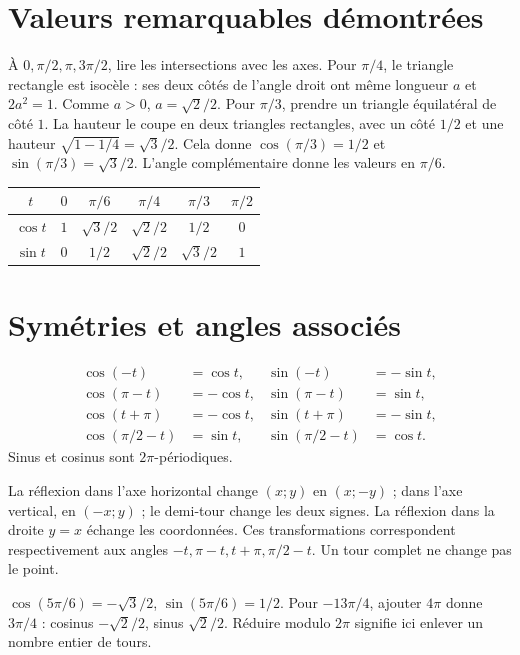 \documentclass[../cours_1re.tex]{subfiles}
\begin{document}
\section{Valeurs remarquables démontrées}
À $0,\pi/2,\pi,3\pi/2$, lire les intersections avec les axes.
Pour $\pi/4$, le triangle rectangle est isocèle : ses deux côtés de l'angle droit ont même longueur $a$ et $2a^2=1$. Comme $a>0$, $a=\sqrt2/2$.
Pour $\pi/3$, prendre un triangle équilatéral de côté $1$. La hauteur le coupe en deux triangles rectangles, avec un côté $1/2$ et une hauteur $\sqrt{1-1/4}=\sqrt3/2$. Cela donne $\cos(\pi/3)=1/2$ et $\sin(\pi/3)=\sqrt3/2$. L'angle complémentaire donne les valeurs en $\pi/6$.
\begin{center}\begin{tabular}{c|ccccc}
$t$&$0$&$\pi/6$&$\pi/4$&$\pi/3$&$\pi/2$\\\hline
$\cos t$&$1$&$\sqrt3/2$&$\sqrt2/2$&$1/2$&$0$\\
$\sin t$&$0$&$1/2$&$\sqrt2/2$&$\sqrt3/2$&$1$
\end{tabular}\end{center}
\section{Symétries et angles associés}
\begin{propriete}
\[
\begin{aligned}
\cos(-t)&=\cos t,&\sin(-t)&=-\sin t,\\
\cos(\pi-t)&=-\cos t,&\sin(\pi-t)&=\sin t,\\
\cos(t+\pi)&=-\cos t,&\sin(t+\pi)&=-\sin t,\\
\cos(\pi/2-t)&=\sin t,&\sin(\pi/2-t)&=\cos t.
\end{aligned}
\]
Sinus et cosinus sont $2\pi$-périodiques.
\end{propriete}
\begin{demonstration}
La réflexion dans l'axe horizontal change $(x;y)$ en $(x;-y)$ ; dans l'axe vertical, en $(-x;y)$ ; le demi-tour change les deux signes. La réflexion dans la droite $y=x$ échange les coordonnées. Ces transformations correspondent respectivement aux angles $-t,\pi-t,t+\pi,\pi/2-t$. Un tour complet ne change pas le point.
\end{demonstration}
\begin{exemple}
$\cos(5\pi/6)=-\sqrt3/2$, $\sin(5\pi/6)=1/2$.
Pour $-13\pi/4$, ajouter $4\pi$ donne $3\pi/4$ : cosinus $-\sqrt2/2$, sinus $\sqrt2/2$.
Réduire modulo $2\pi$ signifie ici enlever un nombre entier de tours.
\end{exemple}
\end{document}
